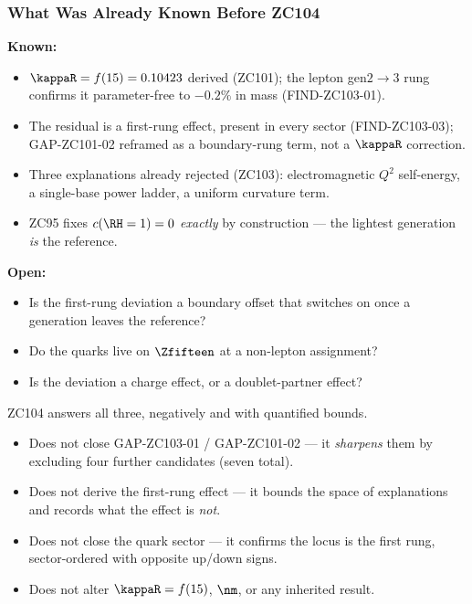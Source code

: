 \documentclass[12pt, a4paper]{article}
\begin{document}
\subsubsection{What Was Already Known Before ZC104}

\begin{keybox}[title={Pre-ZC104 Status}]
\textbf{Known:}
\begin{itemize}[leftmargin=2em, noitemsep]
  \item $\kappaR=f(15)=0.10423$ derived (ZC101); the lepton gen$2{\to}3$ rung
    confirms it parameter-free to $-0.2\%$ in mass (FIND-ZC103-01).
  \item The residual is a first-rung effect, present in every sector
    (FIND-ZC103-03); GAP-ZC101-02 reframed as a boundary-rung term, not a
    $\kappaR$ correction.
  \item Three explanations already rejected (ZC103): electromagnetic $Q^2$
    self-energy, a single-base power ladder, a uniform curvature term.
  \item ZC95 fixes $c(\RH=1)=0$ \emph{exactly} by construction --- the lightest
    generation \emph{is} the reference.
\end{itemize}

\textbf{Open:}
\begin{itemize}[leftmargin=2em, noitemsep]
  \item Is the first-rung deviation a boundary offset that switches on once a
    generation leaves the reference?
  \item Do the quarks live on $\Zfifteen$ at a non-lepton assignment?
  \item Is the deviation a charge effect, or a doublet-partner effect?
\end{itemize}

ZC104 answers all three, negatively and with quantified bounds.
\end{keybox}

\begin{keybox}[title={What ZC104 Does NOT Do}]
\begin{itemize}[leftmargin=2em, noitemsep]
  \item Does not close GAP-ZC103-01 / GAP-ZC101-02 --- it \emph{sharpens} them by
    excluding four further candidates (seven total).
  \item Does not derive the first-rung effect --- it bounds the space of
    explanations and records what the effect is \emph{not}.
  \item Does not close the quark sector --- it confirms the locus is the first
    rung, sector-ordered with opposite up/down signs.
  \item Does not alter $\kappaR=f(15)$, $\nm$, or any inherited result.
\end{itemize}
\end{keybox}
\end{document}
